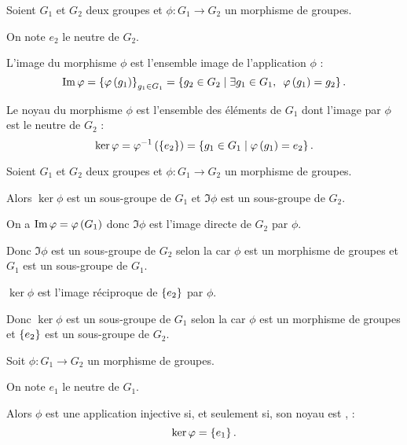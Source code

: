 \begin{defi}
Soient \(G_1\) et \(G_2\) deux groupes et \(\phi:G_1\to G_2\) un morphisme de groupes.

On note \(e_2\) le neutre de \(G_2\).

L'image du morphisme \(\phi\) est l'ensemble image de l'application \(\phi\) : \[\Im\phi=\accol{\phi\paren{g_1}}_{g_1\in G_1}=\accol{g_2\in G_2\tq\quantifs{\exists g_1\in G_1}\phi\paren{g_1}=g_2}.\]

Le noyau du morphisme \(\phi\) est l'ensemble des éléments de \(G_1\) dont l'image par \(\phi\) est le neutre de \(G_2\) : \[\ker\varphi=\varphi^{-1}\left(\left\lbrace e_2\right\rbrace\right)=\left\lbrace g_1\in G_1\;\middle|\;\varphi\left(g_1\right)=e_2\right\rbrace.\]
\end{defi}

\begin{prop}
Soient \(G_1\) et \(G_2\) deux groupes et \(\phi:G_1\to G_2\) un morphisme de groupes.

Alors \(\ker\phi\) est un sous-groupe de \(G_1\) et \(\Im\phi\) est un sous-groupe de \(G_2\).
\end{prop}

\begin{dem}
On a \(\operatorname{Im}\varphi=\varphi\left(G_1\right)\) donc \(\Im\phi\) est l'image directe de \(G_2\) par \(\phi\).

Donc \(\Im\phi\) est un sous-groupe de \(G_2\) selon la  car \(\phi\) est un morphisme de groupes et \(G_1\) est un sous-groupe de \(G_1\).

\(\ker\phi\) est l'image réciproque de \(\left\lbrace e_2\right\rbrace\) par \(\phi\).

Donc \(\ker\phi\) est un sous-groupe de \(G_1\) selon la  car \(\phi\) est un morphisme de groupes et \(\left\lbrace e_2\right\rbrace\) est un sous-groupe de \(G_2\).
\end{dem}

\begin{theo}
Soit \(\phi:G_1\to G_2\) un morphisme de groupes.

On note \(e_1\) le neutre de \(G_1\).

Alors \(\phi\) est une application injective si, et seulement si, son noyau est , \cad : \[\ker\varphi=\left\lbrace e_1\right\rbrace.\]
\end{theo}

